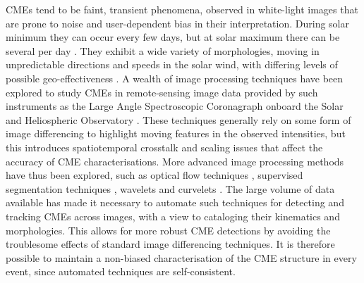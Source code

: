 \documentclass[referee,a4paper,12pt,traditabstract]{swsc}
\begin{document}
\begin{linenumbers}
CMEs tend to be faint, transient phenomena, observed in white-light images that are prone to noise and user-dependent bias in their interpretation. During solar minimum they can occur every few days, but at solar maximum there can be several per day \citep{2000JGR...10518169S, 2004JGRA..10907105Y}. They exhibit a wide variety of morphologies, moving in unpredictable directions and speeds in the solar wind, with differing levels of possible geo-effectiveness \citep{2001JASTP..63..389P, 2005AnGeo..23.1033S, 2009GeoRL..3608102D, 2012SoPh..tmp...47L}. A wealth of image processing techniques have been explored to study CMEs in remote-sensing image data provided by such instruments as the Large Angle Spectroscopic Coronagraph \citep[LASCO;][]{1995SoPh..162..357B} onboard the Solar and Heliospheric Observatory \citep[SOHO;][]{1995SoPh..162....1D}. These techniques generally rely on some form of image differencing to highlight moving features in the observed intensities, but this introduces spatiotemporal crosstalk and scaling issues that affect the accuracy of CME characterisations. More advanced image processing methods have thus been explored, such as optical flow techniques \citep{2006ApJ...652.1747C}, supervised segmentation techniques \citep{Goussies:2010:DTC:1749630.1750150}, wavelets \citep{2003A&A...398.1185S} and curvelets \citep{2011AdSpR..47.2118G}. The large volume of data available has made it necessary to automate such techniques for detecting and tracking CMEs across images, with a view to cataloging their kinematics and morphologies. This allows for more robust CME detections by avoiding the troublesome effects of standard image differencing techniques. It is therefore possible to maintain a non-biased characterisation of the CME structure in every event, since automated techniques are self-consistent.


\end{linenumbers}
\end{document}
